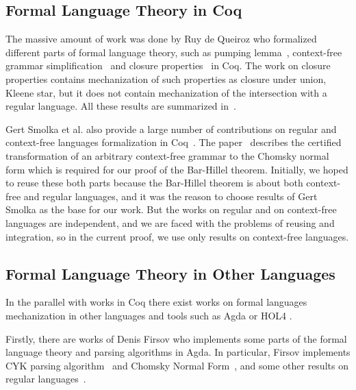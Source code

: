 \documentclass[runningheads]{llncs}
\begin{document}
\subsection{Formal Language Theory in Coq}

The massive amount of work was done by Ruy de Queiroz who formalized different parts of formal language theory, such as pumping lemma~\cite{ramos2015formalizationPumping,ramos2018SomeApp}, context-free grammar simplification~\cite{ramos2015formalization} and closure properties~\cite{ramos2015formalizationClosure} in Coq.
The work on closure properties contains mechanization of such properties as closure under union, Kleene star, but it does not contain mechanization of the intersection with a regular language.
All these results are summarized in~\cite{ramos2016formalization}.

Gert Smolka et al. also provide a large number of contributions on regular and context-free languages formalization in Coq~\cite{smolka2017regular,smolka2013regular,kaiser2012constructive,smolkaHofmann2016}.
The paper~\cite{smolkaHofmann2016} describes the certified transformation of an arbitrary context-free grammar to the Chomsky normal form which is required for our proof of the Bar-Hillel theorem.
Initially, we hoped to reuse these both parts because the Bar-Hillel theorem is about both context-free and regular languages, and it was the reason to choose results of Gert Smolka as the base for our work.
But the works on regular and on context-free languages are independent, and we are faced with the problems of reusing and integration, so in the current proof, we use only results on context-free languages.

\subsection{Formal Language Theory in Other Languages}

In the parallel with works in Coq there exist works on formal languages mechanization in other languages and tools such as Agda \cite{firsov2016cfl} or HOL4 \cite{barthwal2010formalisation}.

Firstly, there are works of Denis Firsov who implements some parts of the formal language theory and parsing algorithms in Agda.
In particular, Firsov implements CYK parsing algorithm~\cite{firsov2014certified,firsov2016cfl} and Chomsky Normal Form~\cite{firsov2015certified}, and some other results on regular languages~\cite{10.1007/978-3-319-03545-1_7}.
\end{document}
